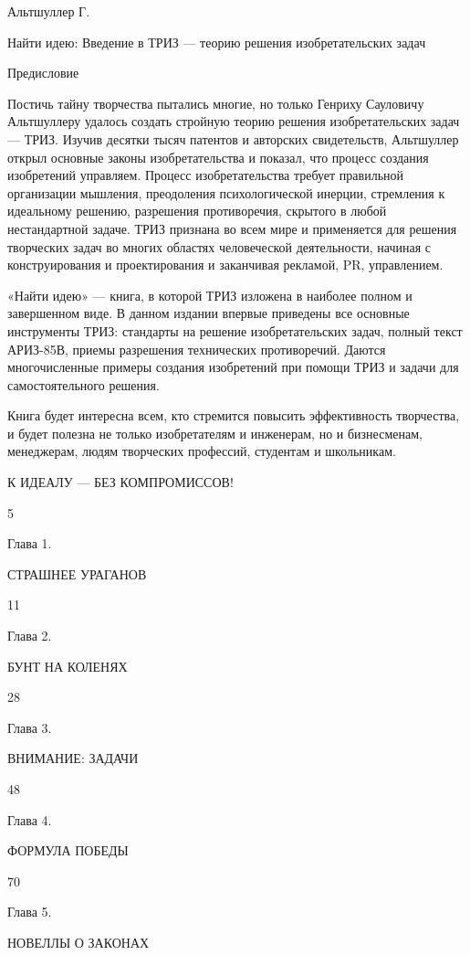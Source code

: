 
Альтшуллер Г.

Найти идею: Введение в ТРИЗ — теорию решения изобретательских задач



Предисловие


Постичь тайну творчества пытались  многие, но только Генриху Сауловичу
Альтшуллеру удалось  создать стройную теорию  решения изобретательских
задач — ТРИЗ. Изучив десятки  тысяч патентов и авторских свидетельств,
Альтшуллер  открыл основные  законы  изобретательства  и показал,  что
процесс  создания  изобретений   управляем.  Процесс  изобретательства
требует правильной  организации мышления,  преодоления психологической
инерции,  стремления к  идеальному  решению, разрешения  противоречия,
скрытого  в любой  нестандартной задаче.  ТРИЗ признана  во всем  мире
и  применяется  для  решения   творческих  задач  во  многих  областях
человеческой деятельности, начиная  с конструирования и проектирования
и заканчивая рекламой, PR, управлением.

«Найти идею»  — книга,  в которой  ТРИЗ изложена  в наиболее  полном и
завершенном  виде. В  данном  издании впервые  приведены все  основные
инструменты ТРИЗ: стандарты на  решение изобретательских задач, полный
текст  АРИЗ-85В, приемы  разрешения  технических противоречий.  Даются
многочисленные примеры  создания изобретений при помощи  ТРИЗ и задачи
для самостоятельного решения.

Книга  будет  интересна  всем, кто  стремится  повысить  эффективность
творчества, и будет полезна не  только изобретателям и инженерам, но и
бизнесменам,  менеджерам,  людям  творческих  профессий,  студентам  и
школьникам.




К ИДЕАЛУ — БЕЗ КОМПРОМИССОВ!


5


Глава 1.


СТРАШНЕЕ УРАГАНОВ


11


Глава 2.


БУНТ НА КОЛЕНЯХ


28


Глава 3.


ВНИМАНИЕ: ЗАДАЧИ


48


Глава 4.


ФОРМУЛА ПОБЕДЫ


70


Глава 5.


НОВЕЛЛЫ О ЗАКОНАХ


